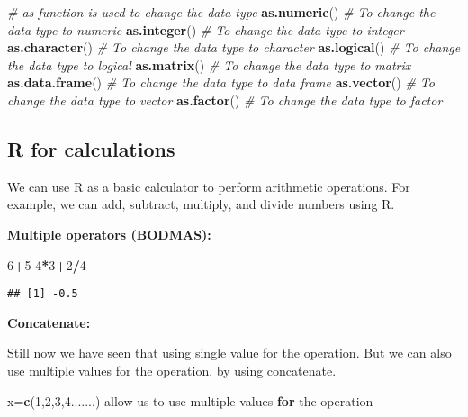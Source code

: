 \documentclass[
]{article}
\newenvironment{Shaded}{\begin{snugshade}}{\end{snugshade}}
\newcommand{\CommentTok}[1]{\textcolor[rgb]{0.56,0.35,0.01}{\textit{#1}}}
\newcommand{\ControlFlowTok}[1]{\textcolor[rgb]{0.13,0.29,0.53}{\textbf{#1}}}
\newcommand{\DecValTok}[1]{\textcolor[rgb]{0.00,0.00,0.81}{#1}}
\newcommand{\FunctionTok}[1]{\textcolor[rgb]{0.13,0.29,0.53}{\textbf{#1}}}
\newcommand{\NormalTok}[1]{#1}
\newcommand{\OtherTok}[1]{\textcolor[rgb]{0.56,0.35,0.01}{#1}}
\newcommand{\SpecialCharTok}[1]{\textcolor[rgb]{0.81,0.36,0.00}{\textbf{#1}}}
\begin{document}
\begin{Shaded}
\begin{Highlighting}[]
\CommentTok{\# as function is used to change the data type}
\FunctionTok{as.numeric}\NormalTok{() }\CommentTok{\# To change the data type to numeric}
\FunctionTok{as.integer}\NormalTok{() }\CommentTok{\# To change the data type to integer}
\FunctionTok{as.character}\NormalTok{() }\CommentTok{\# To change the data type to character}
\FunctionTok{as.logical}\NormalTok{() }\CommentTok{\# To change the data type to logical}
\FunctionTok{as.matrix}\NormalTok{() }\CommentTok{\# To change the data type to matrix}
\FunctionTok{as.data.frame}\NormalTok{() }\CommentTok{\# To change the data type to data frame}
\FunctionTok{as.vector}\NormalTok{() }\CommentTok{\# To change the data type to vector}
\FunctionTok{as.factor}\NormalTok{() }\CommentTok{\# To change the data type to factor}
\end{Highlighting}
\end{Shaded}

\subsection{R for calculations}\label{r-for-calculations}

We can use R as a basic calculator to perform arithmetic operations. For
example, we can add, subtract, multiply, and divide numbers using R.

\textbf{Multiple operators (BODMAS):}

\begin{Shaded}
\begin{Highlighting}[]
 \DecValTok{6}\SpecialCharTok{+}\DecValTok{5{-}4}\SpecialCharTok{*}\DecValTok{3}\SpecialCharTok{+}\DecValTok{2}\SpecialCharTok{/}\DecValTok{4}
\end{Highlighting}
\end{Shaded}

\begin{verbatim}
## [1] -0.5
\end{verbatim}

\textbf{Concatenate:}

Still now we have seen that using single value for the operation. But we
can also use multiple values for the operation. by using concatenate.

\begin{Shaded}
\begin{Highlighting}[]
\NormalTok{x}\OtherTok{=}\FunctionTok{c}\NormalTok{(}\DecValTok{1}\NormalTok{,}\DecValTok{2}\NormalTok{,}\DecValTok{3}\NormalTok{,}\DecValTok{4}\NormalTok{.......)}
\NormalTok{allow us to use multiple values }\ControlFlowTok{for}\NormalTok{ the operation}
\end{Highlighting}
\end{Shaded}
\end{document}
